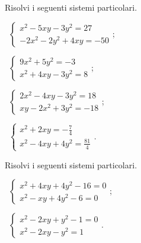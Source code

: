 \begin{esercizio}[\Ast]
\label{ese:6.43}
Risolvi i seguenti sistemi particolari.
\begin{multicols}{2}
 \begin{enumeratea}
 \item~$\left\{\begin{array}{l}x^2-5xy-3y^2=27\\-2x^2-2y^2+4xy=-50\end{array}\right.$;
 \item~$\left\{\begin{array}{l}9x^2+5y^2=-3\\x^2+4xy-3y^2=8\end{array}\right.$;
 \item~$\left\{\begin{array}{l}2x^2-4xy-3y^2=18\\xy-2x^2+3y^2=-18\end{array}\right.$;
 \item~$\left\{\begin{array}{l}x^2+2xy=-\frac 7 4\\x^2-4xy+4y^2=\frac{81} 4\end{array}\right.$.
 \end{enumeratea}
\end{multicols}
\end{esercizio}
\newpage
\begin{esercizio}[\Ast]
\label{ese:6.44}
Risolvi i seguenti sistemi particolari.
\begin{multicols}{2}
 \begin{enumeratea}
 \item~$\left\{\begin{array}{l}x^2+4xy+4y^2-16=0\\x^2-xy+4y^2-6=0\end{array}\right.$;
 \item~$\left\{\begin{array}{l}x^2-2xy+y^2-1=0\\x^2-2xy-y^2=1\end{array}\right.$.
 \end{enumeratea}
\end{multicols}
\end{esercizio}

